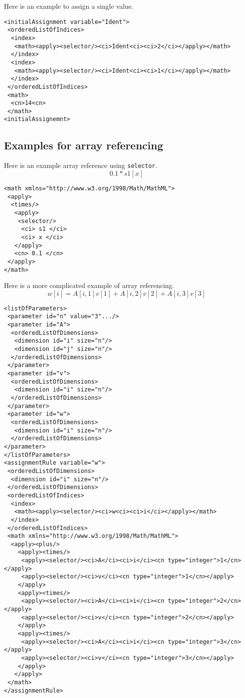 Here is an example to assign a single value. 

\begin{verbatim}
<initialAssignment variable="Ident"> 
 <orderedListOfIndices>
  <index>
   <math><apply><selector/><ci>Ident<ci><ci>2</ci></apply></math>
  </index>
  <index>
   <math><apply><selector/><ci>Ident<ci><ci>1</ci></apply></math>
  </index>
 </orderedListOfIndices>
 <math>
  <cn>14<cn>
 </math>
<initialAssignemnt>
\end{verbatim}

\subsection{Examples for array referencing}

Here is an example array reference using {\tt selector}.
\begin{displaymath}
0.1 * s1[x]
\end{displaymath}
\begin{verbatim}
<math xmlns="http://www.w3.org/1998/Math/MathML">
 <apply>
  <times/>
   <apply>
    <selector/>
     <ci> s1 </ci>
     <ci> x </ci> 
   </apply>
   <cn> 0.1 </cn>
 </apply>
</math>
\end{verbatim}


Here is a more complicated example of array referencing.
\begin{displaymath}
w[i]= A[i,1]v[1]+ A[i,2]v[2]+ A[i,3]v[3]
\end{displaymath}

\begin{verbatim}
<listOfParameters> 
 <parameter id="n" value="3".../>
 <parameter id="A">
  <orderedListOfDimensions>
   <dimension id="i" size="n"/> 
   <dimension id="j" size="n"/>
  </orderedListOfDimensions> 
 </parameter> 
 <parameter id="v">
  <orderedListOfDimensions>
   <dimension id="i" size="n"/>
  </orderedListOfDimensions> 
 </parameter> 
 <parameter id="w">
  <orderedListOfDimensions>
   <dimension id="i" size="n"/>
  </orderedListOfDimensions> 
</parameter>
</listOfParameters>
<assignmentRule variable="w">
 <orderedListOfDimensions>
  <dimension id="i" size="n"/>
 </orderedListOfDimensions> 
 <orderedListOfIndices>
  <index>
   <math><apply><selector/><ci>w<ci><ci>i</ci></apply></math>
  </index>
 </orderedListOfIndices>
 <math xmlns="http://www.w3.org/1998/Math/MathML">
  <apply><plus/>
    <apply><times/>
     <apply><selector/><ci>A</ci><ci>i</ci><cn type="integer">1</cn></apply>
     <apply><selector/><ci>v</ci><cn type="integer">1</cn></apply>
    </apply>
    <apply><times/>
     <apply><selector/><ci>A</ci><ci>i</ci><cn type="integer">2</cn></apply>
     <apply><selector/><ci>v</ci><cn type="integer">2</cn></apply>
    </apply>
    <apply><times/>
     <apply><selector/><ci>A</ci><ci>i</ci><cn type="integer">3</cn></apply>
     <apply><selector/><ci>v</ci><cn type="integer">3</cn></apply>
    </apply>
   </apply>
 </math>
</assignmentRule>
\end{verbatim}

